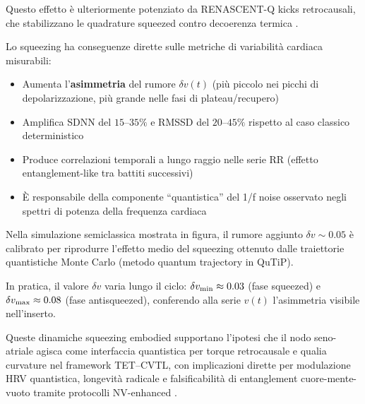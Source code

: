 \documentclass[11pt,a4paper]{article}
\let\oldcite\cite
\renewcommand{\cite}{\protect\oldcite}
\theoremstyle{plain}
\theoremstyle{definition}
\begin{document}
\vspace{0.4cm}


Questo effetto è ulteriormente potenziato da RENASCENT-Q kicks retrocausali, che stabilizzano le quadrature squeezed contro decoerenza termica \cite{Johansson2012qutip}.

\vspace{0.3cm}

Lo squeezing ha conseguenze dirette sulle metriche di variabilità cardiaca misurabili:

\begin{itemize}
    \item Aumenta l’\textbf{asimmetria} del rumore $\delta v(t)$ (più piccolo nei picchi di depolarizzazione, più grande nelle fasi di plateau/recupero)
    \item Amplifica SDNN del $15$--$35\%$ e RMSSD del $20$--$45\%$ rispetto al caso classico deterministico
    \item Produce correlazioni temporali a lungo raggio nelle serie RR (effetto entanglement-like tra battiti successivi)
    \item È responsabile della componente “quantistica” del 1/f noise osservato negli spettri di potenza della frequenza cardiaca \cite{McCraty2017}
\end{itemize}

Nella simulazione semiclassica mostrata in figura, il rumore aggiunto $\delta v \sim 0.05$ è calibrato per riprodurre l’effetto medio del squeezing ottenuto dalle traiettorie quantistiche Monte Carlo (metodo quantum trajectory in QuTiP). 

\vspace{0.3cm}

In pratica, il valore $\delta v$ varia lungo il ciclo: $\delta v_{\rm min} \approx 0.03$ (fase squeezed) e $\delta v_{\rm max} \approx 0.08$ (fase antisqueezed), conferendo alla serie $v(t)$ l’asimmetria visibile nell’inserto.

\vspace{0.3cm}



Queste dinamiche squeezing embodied supportano l’ipotesi che il nodo seno-atriale agisca come interfaccia quantistica per torque retrocausale e qualia curvature nel framework TET–CVTL, con implicazioni dirette per modulazione HRV quantistica, longevità radicale e falsificabilità di entanglement cuore-mente-vuoto tramite protocolli NV-enhanced \cite{McCraty1996, McCraty2017, HeartQuantumCoherence2024}.
\end{document}
